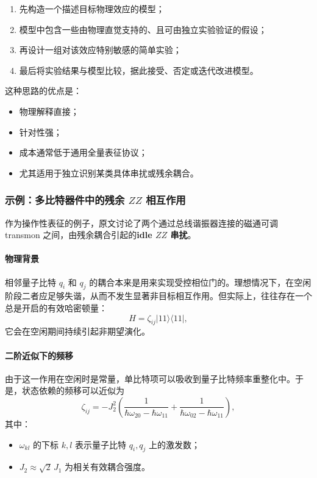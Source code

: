 \documentclass[12pt,a4paper,oneside]{ctexbook}
\begin{document}
\begin{enumerate}
    \item 先构造一个描述目标物理效应的模型；
    \item 模型中包含一些由物理直觉支持的、且可由独立实验验证的假设；
    \item 再设计一组对该效应特别敏感的简单实验；
    \item 最后将实验结果与模型比较，据此接受、否定或迭代改进模型。
\end{enumerate}

这种思路的优点是：
\begin{itemize}
    \item 物理解释直接；
    \item 针对性强；
    \item 成本通常低于通用全量表征协议；
    \item 尤其适用于独立识别某类具体串扰或残余耦合。
\end{itemize}

\subsubsection{示例：多比特器件中的残余 \(ZZ\) 相互作用}

作为操作性表征的例子，原文讨论了两个通过总线谐振器连接的磁通可调 transmon 之间，由残余耦合引起的\textbf{idle \(ZZ\) 串扰}。

\paragraph{物理背景}
相邻量子比特 \(q_i\) 和 \(q_j\) 的耦合本来是用来实现受控相位门的。理想情况下，在空闲阶段二者应足够失谐，从而不发生显著非目标相互作用。但实际上，往往存在一个总是开启的有效哈密顿量：
\[
H=\zeta_{ij}|11\rangle\langle 11|,
\]
它会在空闲期间持续引起非期望演化。

\paragraph{二阶近似下的频移}
由于这一作用在空闲时是常量，单比特项可以吸收到量子比特频率重整化中。于是，状态依赖的频移可以近似为
\begin{equation}
\zeta_{ij}
=
-J_2^2
\left(
\frac{1}{\hbar\omega_{20}-\hbar\omega_{11}}
+
\frac{1}{\hbar\omega_{02}-\hbar\omega_{11}}
\right),
\tag{75}
\end{equation}
其中：
\begin{itemize}
    \item \(\omega_{kl}\) 的下标 \(k,l\) 表示量子比特 \(q_i,q_j\) 上的激发数；
    \item \(J_2 \approx \sqrt{2}\,J_1\) 为相关有效耦合强度。
\end{itemize}
\end{document}
